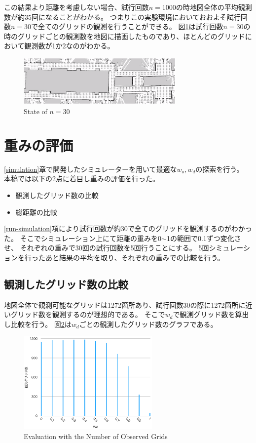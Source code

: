 \documentclass{jsarticle}
\begin{document}
この結果より距離を考慮しない場合、試行回数$n=1000$の時地図全体の平均観測数が約35回になることがわかる。
つまりこの実験環境においておおよそ試行回数$n=30$で全てのグリッドの観測を行うことができる。
図\ref{fig: n30}は試行回数$n=30$の時のグリッドごとの観測数を地図に描画したものであり、ほとんどのグリッドにおいて観測数が1か2なのがわかる。


\begin{figure}[tbh]
 \centering
  \includegraphics[height=25mm]{fig/n30.eps}
  \vspace*{-4mm}
  \caption{State of $n=30$}
  \label{fig: n30}
\end{figure}




\section{重みの評価}
\label{evaluate-weight}
\ref{simulation}章で開発したシミュレーターを用いて最適な$w_o,w_d$の探索を行う。
本稿では以下の2点に着目し重みの評価を行った。
\begin{itemize}
	\item 観測したグリッド数の比較
	\item 総距離の比較
\end{itemize}
\ref{run-simulation}項により試行回数が約30で全てのグリッドを観測するのがわかった。
そこでシミュレーション上にて距離の重みを0$\sim$1の範囲で0.1ずつ変化させ、
それぞれの重みで30回の試行回数を5回行うことにする。
5回シミュレーションを行ったあと結果の平均を取り、それぞれの重みでの比較を行う。


\subsection{観測したグリッド数の比較}
\label{evaluate-observation}
地図全体で観測可能なグリッドは1272箇所あり、試行回数30の際に1272箇所に近いグリッド数を観測するのが理想的である。
そこで$w_d$で観測グリッド数を算出し比較を行う。
図\ref{fig: evaluate-observation}は$w_d$ごとの観測したグリッド数のグラフである。


\begin{figure}[tbh]
 \centering
  \includegraphics[height=50mm]{fig/evaluate-grid.eps}
  \vspace*{-4mm}
  \caption{Evaluation with the Number of Observed Grids}
  \label{fig: evaluate-observation}
\end{figure}
\end{document}
